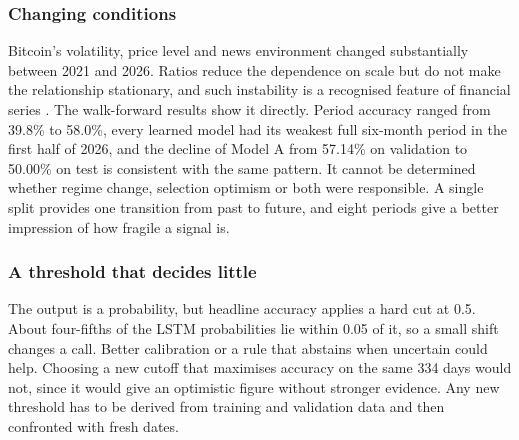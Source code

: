 \subsubsection{Changing conditions}
Bitcoin's volatility, price level and news environment changed substantially between 2021 and 2026. Ratios reduce the dependence on scale but do not make the relationship stationary, and such instability is a recognised feature of financial series \cite{lo2004}. The walk-forward results show it directly. Period accuracy ranged from 39.8\% to 58.0\%, every learned model had its weakest full six-month period in the first half of 2026, and the decline of Model A from 57.14\% on validation to 50.00\% on test is consistent with the same pattern. It cannot be determined whether regime change, selection optimism or both were responsible. A single split provides one transition from past to future, and eight periods give a better impression of how fragile a signal is.

\subsubsection{A threshold that decides little}
The output is a probability, but headline accuracy applies a hard cut at 0.5. About four-fifths of the LSTM probabilities lie within 0.05 of it, so a small shift changes a call. Better calibration \cite{guo2017} or a rule that abstains when uncertain could help. Choosing a new cutoff that maximises accuracy on the same 334 days would not, since it would give an optimistic figure without stronger evidence. Any new threshold has to be derived from training and validation data and then confronted with fresh dates.


